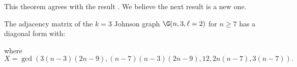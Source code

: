 This theorem agrees with the result \cite[Theorem SNF3]{brouwer:prank}.  We believe the next result is a new one.


\begin{theorem}
The adjacency matrix of the $k=3$ Johnson graph $\G(n, 3, \ell = 2)$ for $n \geq 7$ has a diagonal form with:
\begin{center}
\end{center}
where 
\[X = \gcd(3(n-3)(2n-9), (n-7)(n-3)(2n-9), 12, 2n(n-7), 3(n-7)).\]
\end{theorem}
